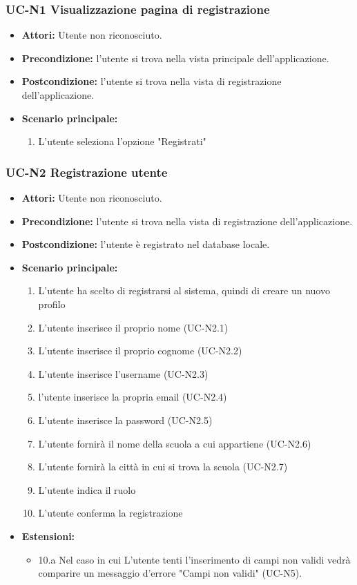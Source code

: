 \subsubsection{UC-N1 Visualizzazione pagina di registrazione}
	\begin{itemize}
		\item \textbf{Attori:} Utente non riconosciuto.
		\item \textbf{Precondizione:} l'utente si trova nella vista principale dell'applicazione.
		\item \textbf{Postcondizione:} l'utente si trova nella vista di registrazione dell'applicazione.
		\item \textbf{Scenario principale:}
		\begin{enumerate}
			\item L'utente seleziona l'opzione "Registrati"
		\end{enumerate}
	\end{itemize}


\subsubsection{UC-N2 Registrazione utente}
\begin{itemize}
		\item \textbf{Attori: }Utente non riconosciuto.
		\item \textbf{Precondizione: }l'utente si trova nella vista di registrazione dell'applicazione.
		\item \textbf{Postcondizione: }l'utente è registrato nel database locale.
		\item \textbf{Scenario principale: }
		\begin{enumerate}
		\item L'utente ha scelto di registrarsi al sistema, quindi di creare un nuovo profilo
		\item L'utente inserisce il proprio nome (UC-N2.1)
		\item L'utente inserisce il proprio cognome (UC-N2.2)
		\item L'utente inserisce l'username (UC-N2.3)
		\item l'utente inserisce la propria email (UC-N2.4)
		\item L'utente inserisce la password (UC-N2.5)
		\item L'utente fornirà il nome della scuola a cui appartiene (UC-N2.6)
		\item L'utente fornirà la città in cui si trova la scuola (UC-N2.7)
		\item L'utente indica il ruolo
		\item L'utente conferma la registrazione
		\end{enumerate}
		\item \textbf{Estensioni: }
		\begin{itemize}
			\item 10.a Nel caso in cui L'utente tenti l'inserimento di campi non validi vedrà comparire un messaggio d'errore "Campi non validi" (UC-N5).
		\end{itemize}
\end{itemize}


